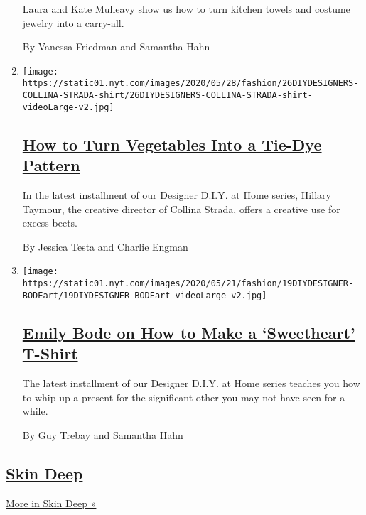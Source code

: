 \begin{enumerate}
  Laura and Kate Mulleavy show us how to turn kitchen towels and costume
  jewelry into a carry-all.

  By Vanessa Friedman and Samantha Hahn
\item
  \texttt{[image: https://static01.nyt.com/images/2020/05/28/fashion/26DIYDESIGNERS-COLLINA-STRADA-shirt/26DIYDESIGNERS-COLLINA-STRADA-shirt-videoLarge-v2.jpg]}

  \hypertarget{how-to-turn-vegetables-into-a-tie-dye-pattern}{%
  \subsection{\texorpdfstring{\href{/2020/05/27/style/tie-dye-plaid-with-collina-strada.html}{How
  to Turn Vegetables Into a Tie-Dye
  Pattern}}{How to Turn Vegetables Into a Tie-Dye Pattern}}\label{how-to-turn-vegetables-into-a-tie-dye-pattern}}

  In the latest installment of our Designer D.I.Y. at Home series,
  Hillary Taymour, the creative director of Collina Strada, offers a
  creative use for excess beets.

  By Jessica Testa and Charlie Engman
\item
  \texttt{[image: https://static01.nyt.com/images/2020/05/21/fashion/19DIYDESIGNER-BODEart/19DIYDESIGNER-BODEart-videoLarge-v2.jpg]}

  \hypertarget{emily-bode-on-how-to-make-a-sweetheart-t-shirt}{%
  \subsection{\texorpdfstring{\href{/2020/05/19/style/emily-bode-sweetheart-t-shirt.html}{Emily
  Bode on How to Make a `Sweetheart'
  T-Shirt}}{Emily Bode on How to Make a `Sweetheart' T-Shirt}}\label{emily-bode-on-how-to-make-a-sweetheart-t-shirt}}

  The latest installment of our Designer D.I.Y. at Home series teaches
  you how to whip up a present for the significant other you may not
  have seen for a while.

  By Guy Trebay and Samantha Hahn
\end{enumerate}

\hypertarget{skin-deep}{%
\subsection{\texorpdfstring{\href{/column/skin-deep}{Skin
Deep}}{Skin Deep}}\label{skin-deep}}

\href{/column/skin-deep}{More in Skin Deep »}


